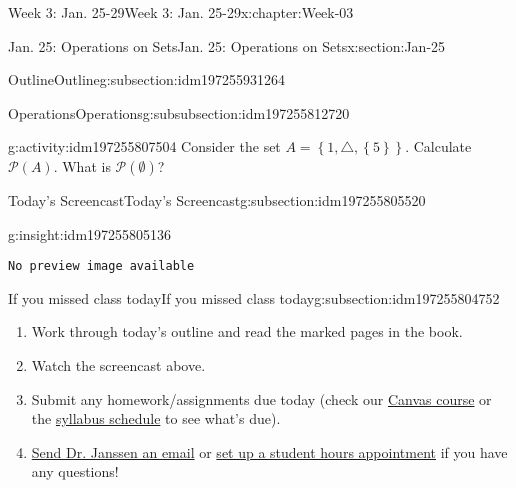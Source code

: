 \documentclass[oneside,10pt,]{book}
\newcommand{\mono}[1]{\texttt{#1}}
\numberwithin{equation}{section}
\newlength{\qrsize}
\newlength{\previewwidth}
\newcommand{\set}[1]{\left\{ {#1} \right\}}
\def\pow{{\mathcal P}}
\newcommand{\pow}{\mathcal P}
\begin{document}
\begin{chapterptx}{Week 3: Jan. 25-29}{}{Week 3: Jan. 25-29}{}{}{x:chapter:Week-03}
\begin{sectionptx}{Jan. 25: Operations on Sets}{}{Jan. 25: Operations on Sets}{}{}{x:section:Jan-25}
\begin{subsectionptx}{Outline}{}{Outline}{}{}{g:subsection:idm197255931264}
\begin{subsubsectionptx}{Operations}{}{Operations}{}{}{g:subsubsection:idm197255812720}
\begin{activity}{}{g:activity:idm197255807504}
Consider the set \(A = \set{1,\triangle,\set{5}}\). Calculate \(\pow(A)\). What is \(\pow(\emptyset)\)?%
\end{activity}%
\end{subsubsectionptx}
\end{subsectionptx}
%
%
\typeout{************************************************}
\typeout{************************************************}
%
\begin{subsectionptx}{Today's Screencast}{}{Today's Screencast}{}{}{g:subsection:idm197255805520}
\begin{insight}{}{g:insight:idm197255805136}%
\setlength{\qrsize}{9em}
\setlength{\previewwidth}{\linewidth}
\addtolength{\previewwidth}{-\qrsize}
\begin{tcbraster}[raster columns=2, raster column skip=1pt, raster halign=center, raster force size=false, raster left skip=0pt, raster right skip=0pt]%
\begin{tcolorbox}[previewstyle, width=\previewwidth]%
\mono{No preview image available}%
\end{tcolorbox}%
\begin{tcolorbox}[qrstyle]%
[QR LINK]\end{tcolorbox}%
\end{tcbraster}%
\end{insight}
\end{subsectionptx}
%
%
\typeout{************************************************}
\typeout{************************************************}
%
\begin{subsectionptx}{If you missed class today}{}{If you missed class today}{}{}{g:subsection:idm197255804752}
%
\begin{enumerate}
\item{}Work through today's outline and read the marked pages in the book.%
\item{}Watch the screencast above.%
\item{}Submit any homework\slash{}assignments due today (check our \href{https://dordt.instructure.com/courses/3110050}{Canvas course} or the \href{https://prof.mkjanssen.org/ds/index.html\#schedule}{syllabus schedule} to see what's due).%
\item{}\href{mailto:mike.janssen@dordt.edu}{Send Dr. Janssen an email} or \href{https://calendly.com/mkjanssen/student-hours}{set up a student hours appointment} if you have any questions!%
\end{enumerate}

\end{subsectionptx}
\end{sectionptx}
\end{chapterptx}
\end{document}
